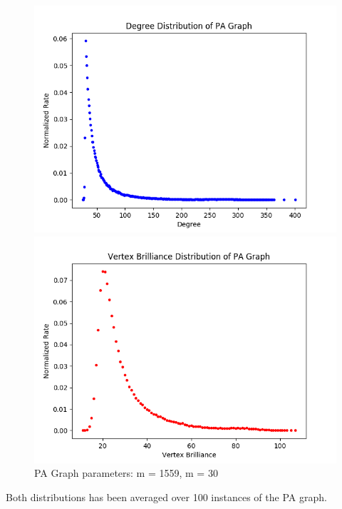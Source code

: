 \documentclass[11pt,a4paper,notitlepage]{article}
\begin{document}
\begin{figure}[H]
    \centering
    \begin{minipage}{0.49\textwidth}
        \centering
        \includegraphics[width=1\textwidth]{pa_graph-1559-30-degree.png}
    \end{minipage}
    \begin{minipage}{0.49\textwidth}
        \centering
        \includegraphics[width=1\textwidth]{pa_graph-1559-30-brilliance.png}
    \end{minipage} \hfill
    \caption{PA Graph parameters: m = 1559, m = 30}
\end{figure}
Both distributions has been averaged over 100 instances of the PA graph. 
\end{document}
